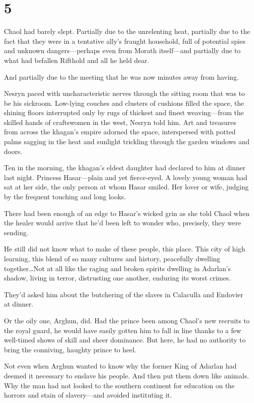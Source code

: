 
\chapter{5}

Chaol had barely slept.
Partially due to the unrelenting heat, partially due to the fact that they were in a tentative ally's fraught household, full of potential spies and unknown dangers---perhaps even from Morath itself---and partially due to what had befallen Rifthold and all he held dear.

And partially due to the meeting that he was now minutes away from having.

Nesryn paced with uncharacteristic nerves through the sitting room that was to be his sickroom.
Low-lying couches and clusters of cushions filled the space, the shining floors interrupted only by rugs of thickest and finest weaving---from the skilled hands of craftswomen in the west, Nesryn told him.
Art and treasures from across the khagan's empire adorned the space, interspersed with potted palms sagging in the heat and sunlight trickling through the garden windows and doors.

Ten in the morning, the khagan's eldest daughter had declared to him at dinner last night.
Princess Hasar---plain and yet fierce-eyed.
A lovely young woman had sat at her side, the only person at whom Hasar smiled.
Her lover or wife, judging by the frequent touching and long looks.

There had been enough of an edge to Hasar's wicked grin as she told Chaol when the healer would arrive that he'd been left to wonder who, precisely, they were sending.

He still did not know what to make of these people, this place.
This city of high learning, this blend of so many cultures and history, peacefully dwelling together\ldots Not at all like the raging and broken spirits dwelling in Adarlan's shadow, living in terror, distrusting one another, enduring its worst crimes.

They'd asked him about the butchering of the slaves in Calaculla and Endovier at dinner.

Or the oily one, Arghun, did.
Had the prince been among Chaol's new recruits to the royal guard, he would have easily gotten him to fall in line thanks to a few well-timed shows of skill and sheer dominance.
But here, he had no authority to bring the conniving, haughty prince to heel.

Not even when Arghun wanted to know why the former King of Adarlan had deemed it necessary to enslave his people.
And then put them down like animals.
Why the man had not looked to the southern continent for education on the horrors and stain of slavery---and avoided instituting it.

